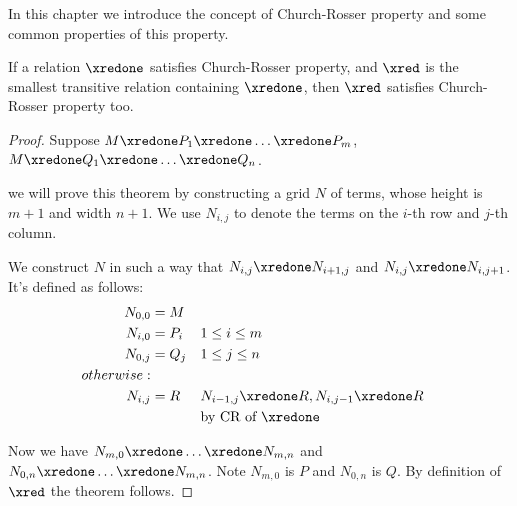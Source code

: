 \documentclass[../../../include/open-logic-section]{subfiles}
\begin{document}


In this chapter we introduce the concept of Church-Rosser property and
some common properties of this property.


\begin{thm} 
  If a relation $\xredone$ satisfies Church-Rosser property, and $\xred$ is the
  smallest transitive relation containing $\xredone$, then $\xred$ satisfies
  Church-Rosser property too.
\end{thm}
\begin{proof}
  Suppose $M \xredone P_1 \xredone \ldots \xredone P_m$, $M \xredone Q_1
  \xredone \ldots \xredone Q_n$.
  
  we will prove this theorem by constructing a grid $N$ of terms, whose height is $m + 1$ and width $n + 1$. We use $N_{i,j}$ to denote the terms
  on the $i$-th row and $j$-th column.
  
  We construct $N$ in such a way that $N_{i,j} \xredone N_{i+1,j}$ and
  $N_{i,j} \xredone N_{i,j+1}$. It's defined as follows:
  \begin{align*}
    N_{0,0} &= M \\
    N_{i,0} &= P_i && 1 \le i \le m \\
    N_{0,j} &= Q_j && 1 \le j \le n \\
    otherwise: & \\
    N_{i,j} &= R && N_{i-1,j} \xredone R, N_{i,j-1} \xredone R \\
            & && \text{by CR of $\xredone$}
  \end{align*}

  Now we have $N_{m,0} \xredone \ldots \xredone N_{m,n}$ and $N_{0,n}
  \xredone \ldots \xredone N_{m,n}$. Note $N_{m,0}$ is $P$ and $N_{0,n}$
  is $Q$. By definition of $\xred$ the theorem follows.
\end{proof}
\end{document}
